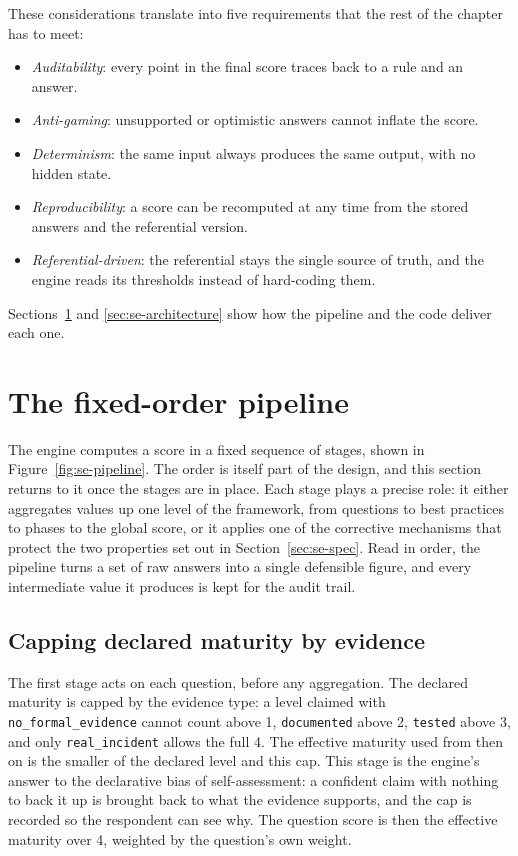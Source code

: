 These considerations translate into five requirements that the rest of the chapter
has to meet:
\begin{itemize}
  \item \emph{Auditability}: every point in the final score traces back to a rule
        and an answer.
  \item \emph{Anti-gaming}: unsupported or optimistic answers cannot inflate the
        score.
  \item \emph{Determinism}: the same input always produces the same output, with no
        hidden state.
  \item \emph{Reproducibility}: a score can be recomputed at any time from the
        stored answers and the referential version.
  \item \emph{Referential-driven}: the referential stays the single source of
        truth, and the engine reads its thresholds instead of hard-coding them.
\end{itemize}
Sections~\ref{sec:se-pipeline} and \ref{sec:se-architecture} show how the pipeline
and the code deliver each one.


\section{The fixed-order pipeline}
\label{sec:se-pipeline}

The engine computes a score in a fixed sequence of stages, shown in
Figure~\ref{fig:se-pipeline}. The order is itself part of the design, and this
section returns to it once the stages are in place. Each stage plays a precise
role: it either aggregates values up one level of the framework, from questions to
best practices to phases to the global score, or it applies one of the corrective
mechanisms that protect the two properties set out in Section~\ref{sec:se-spec}.
Read in order, the pipeline turns a set of raw answers into a single defensible
figure, and every intermediate value it produces is kept for the audit trail.

\subsection{Capping declared maturity by evidence}

The first stage acts on each question, before any aggregation. The declared
maturity is capped by the evidence type: a level claimed with
\texttt{no\_formal\_evidence} cannot count above 1, \texttt{documented} above 2,
\texttt{tested} above 3, and only \texttt{real\_incident} allows the full 4. The
effective maturity used from then on is the smaller of the declared level and this
cap. This stage is the engine's answer to the declarative bias of self-assessment:
a confident claim with nothing to back it up is brought back to what the evidence
supports, and the cap is recorded so the respondent can see why. The question score
is then the effective maturity over 4, weighted by the question's own weight.

